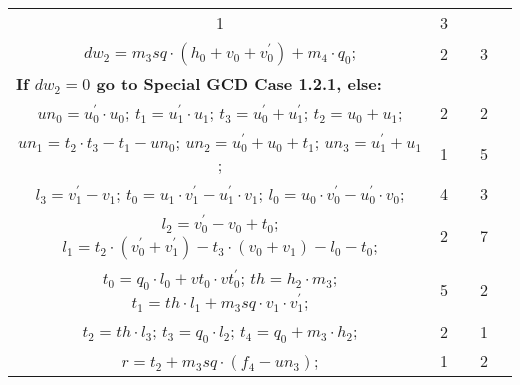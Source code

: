 \begin{tabular}{|c|cr|c|c|c|c|}
{} & 1 &  & 3 & \\
\multicolumn{3}{|R{340pt}|}{ 
$dw_2=m_3sq \cdot (h_0+v_0+v^{\prime}_0)+m_4 \cdot q_0$;\hspace{4pt}
} & 2 &  & 3 & \\
\multicolumn{3}{|l|}{ 
 \bf{If $dw_2 = 0$ go to Special GCD Case 1.2.1, else:} } &  &  &  & \\
\multicolumn{3}{|R{340pt}|}{ 
$un_0=u^{\prime}_0 \cdot u_0$;\hspace{4pt}
$t_1=u^{\prime}_1 \cdot u_1$;\hspace{4pt}
$t_3=u^{\prime}_0+u^{\prime}_1$;\hspace{4pt}
$t_2=u_0+u_1$;\hspace{4pt}
} & 2 &  & 2 & \\
\multicolumn{3}{|R{340pt}|}{ 
$un_1=t_2 \cdot t_3-t_1-un_0$;\hspace{4pt}
$un_2=u^{\prime}_0+u_0+t_1$;\hspace{4pt}
$un_3=u^{\prime}_1+u_1$;\hspace{4pt}
} & 1 &  & 5 & \\
\multicolumn{3}{|R{340pt}|}{ 
$l_3=v^{\prime}_1-v_1$;\hspace{4pt}
$t_0=u_1 \cdot v^{\prime}_1-u^{\prime}_1 \cdot v_1$;\hspace{4pt}
$l_0=u_0 \cdot v^{\prime}_0-u^{\prime}_0 \cdot v_0$;\hspace{4pt}
} & 4 &  & 3 & \\
\multicolumn{3}{|R{340pt}|}{ 
$l_2=v^{\prime}_0-v_0+t_0$;\hspace{4pt}
$l_1=t_2 \cdot (v^{\prime}_0+v^{\prime}_1)-t_3 \cdot (v_0+v_1)-l_0-t_0$;\hspace{4pt}
} & 2 &  & 7 & \\
\multicolumn{3}{|R{340pt}|}{ 
$t_0=q_0 \cdot l_0+vt_0 \cdot vt^{\prime}_0$;\hspace{4pt}
$th=h_2 \cdot m_3$;\hspace{4pt}
$t_1=th \cdot l_1+m_3sq \cdot v_1 \cdot v^{\prime}_1$;\hspace{4pt}
} & 5 &  & 2 & \\
\multicolumn{3}{|R{340pt}|}{ 
$t_2=th \cdot l_3$;\hspace{4pt}
$t_3=q_0 \cdot l_2$;\hspace{4pt}
$t_4=q_0+m_3 \cdot h_2$;\hspace{4pt}
} & 2 &  & 1 & \\
\multicolumn{3}{|R{340pt}|}{ 
$r=t_2+m_3sq \cdot (f_4-un_3)$;\hspace{4pt}
} & 1 &  & 2 & \\

\end{tabular}
